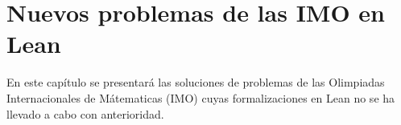 \chapter{Nuevos problemas de las IMO en Lean}\label{cap4}

En este capítulo se presentará las soluciones de problemas de las
Olimpiadas Internacionales de Mátematicas (IMO) cuyas formalizaciones en
Lean no se ha llevado a cabo con anterioridad.



